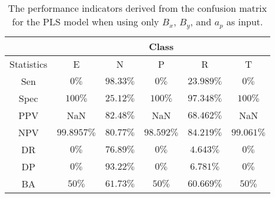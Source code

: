 \begin{table}[!ht]
	\centering
	\begin{tabular}{|c|c|c|c|c|c|}
		\hline
		 & \multicolumn{5}{c|}{Class} \\ \hline
		Statistics & E & N & P & R & T \\ \hline
		Sen & $0\%$ & $98.33\%$ & $0\%$ & $23.989\%$ & $0\%$ \\ \hline
		Spec & $100\%$ & $25.12\%$ & $100\%$ & $97.348\%$ & $100\%$ \\ \hline
		PPV & NaN & $82.48\%$ & NaN & $68.462\%$ & NaN \\ \hline
		NPV & $99.8957\%$ & $80.77\%$ & $98.592\%$ & $84.219\%$ & $99.061\%$ \\ \hline
		DR & $0\%$ & $76.89\%$ & $0\%$ & $4.643\%$ & $0\%$ \\ \hline
		DP & $0\%$ & $93.22\%$ & $0\%$ & $6.781\%$ & $0\%$ \\ \hline
		BA & $50\%$ & $61.73\%$ & $50\%$ & $60.669\%$ & $50\%$ \\ \hline
	\end{tabular}
	\caption{The performance indicators derived from the confusion matrix for the PLS model when using only $B_{x}$, $B_{y}$, and $a_{p}$ as input.}
	\label{tab:cs:reverse:xyap:pls}
\end{table}
